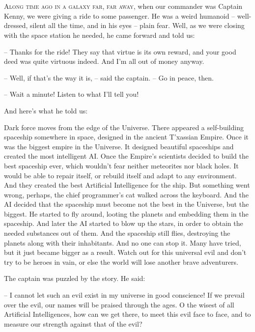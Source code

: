 \documentclass[ebook,twoside,final,openright]{memoir}
\begin{document}
\chapter{}
\par
\lettrine{A}{long time ago in a galaxy far, far away,} when our commander was Captain Kenny, we were giving a ride to some passenger. He was a weird humanoid – well-dressed, silent all the time, and in his eyes – plain fear. Well, as we were closing with the space station he needed, he came forward and told us: \par
\par
– Thanks for the ride! They say that virtue is its own reward, and your good deed was quite virtuous indeed. And I’m all out of money anyway.\par
– Well, if that’s the way it is, – said the captain. – Go in peace, then. \par
– Wait a minute! Listen to what I’ll tell you! \par
 And here’s what he told us:\par
\par
Dark force moves from the edge of the Universe. There appeared a self-building spaceship somewhere in space, designed in the ancient T'xassian Empire. Once it was the biggest empire in the Universe. It designed beautiful spaceships and created the most intelligent AI. Once the Empire’s scientists decided to build the best spaceship ever, which wouldn’t fear neither meteorites nor black holes. It would be able to repair itself, or rebuild itself and adapt to any environment. And they created the best Artificial Intelligence for the ship. But something went wrong, perhaps, the chief programmer’s cat walked across the keyboard. And the AI decided that the spaceship must become not the best in the Universe, but the biggest. He started to fly around, looting the planets and embedding them in the spaceship. And later the AI started to blow up the stars, in order to obtain the needed substances out of them. And the spaceship still flies, destroying the planets along with their inhabitants. And no one can stop it. Many have tried, but it just became bigger as a result. Watch out for this universal evil and don’t try to be heroes in vain, or else the world will lose another brave adventurers.\par
\par
The captain was puzzled by the story. He said:\par
– I cannot let such an evil exist in my universe in good conscience! If we prevail over the evil, our names will be praised through the ages. O the wisest of all Artificial Intelligences, how can we get there, to meet this evil face to face, and to measure our strength against that of the evil?\par
\end{document}
